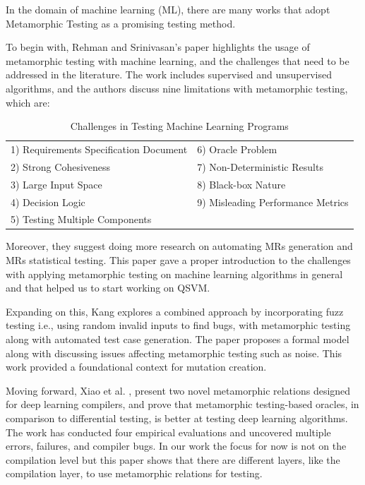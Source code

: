 \documentclass[12pt,a4paper]{article}
\begin{document}
	In the domain of machine learning (ML), there are many works that adopt Metamorphic Testing as a promising testing method. 
	
	To begin with, Rehman and Srinivasan's \cite{frehman2023} paper highlights the usage of metamorphic testing with machine learning, and the challenges that need to be addressed in the literature. The work includes supervised and unsupervised algorithms, and the authors discuss nine limitations with metamorphic testing, which are:
	
	\begin{table}[h!]
		\centering
		\caption{Challenges in Testing Machine Learning Programs}
		\label{tab:my_items_two_col}
		\begin{tabular}{ll}
			\toprule
			1) Requirements Specification Document & 6) Oracle Problem \\
			2) Strong Cohesiveness & 7) Non-Deterministic Results \\
			3) Large Input Space & 8) Black-box Nature \\
			4) Decision Logic & 9) Misleading Performance Metrics \\
			5) Testing Multiple Components & \\
			\bottomrule
		\end{tabular}
	\end{table}
	
	Moreover, they suggest doing more research on automating MRs generation and MRs statistical testing. This paper gave a proper introduction to the challenges with applying metamorphic testing on machine learning algorithms in general and that helped us to start working on QSVM. 
	
	Expanding on this, Kang \cite{dkang2022} explores a combined approach by incorporating fuzz testing i.e., using random invalid inputs to find bugs, with metamorphic testing along with automated test case generation. The paper proposes a formal model along with discussing issues affecting metamorphic testing such as noise. This work provided a foundational context for mutation creation.
	
	Moving forward, Xiao et al. \cite{dciao2022}, present two novel metamorphic relations designed for deep learning compilers, and prove that metamorphic testing-based oracles, in comparison to differential testing, is better at testing deep learning algorithms. The work has conducted four empirical evaluations and uncovered multiple errors, failures, and compiler bugs. In our work the focus for now is not on the compilation level but this paper shows that there are different layers, like the compilation layer, to use metamorphic relations for testing.
	
\end{document}
